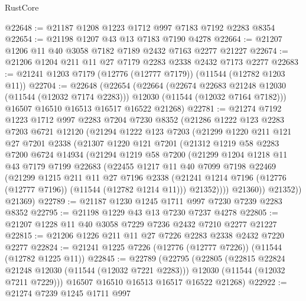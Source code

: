\begin{lexlean}{RustCore}
\begin{coremodule}
@22648 := @21187 @1208 @1223 @1712 @997 @7183 @7192 @2283 @8354
@22654 := @21198 @1207 @43 @13 @7183 @7190 @4278
@22664 := @21207 @1206 @11 @40 @3058 @7182 @7189 @2432 @7163 @2277 @21227
@22674 := @21206 @1204 @211 @11 @27 @7179 @2283 @2338 @2432 @7173 @2277
@22683 := @21241 @1203 @7179 (@12776 (@12777 @7179)) (@11544 (@12782 @1203 @11))
@22704 := @22648
    (@22654
      (@22664
        (@22674 @22683 @21248 @12030 (@11544 (@12032 @7174 @2283)))
        @12030
        (@11544 (@12032 @7164 @7182)))
      @16507
      @16510
      @16513
      @16517
      @16522
      @21268)
@22781 := @21274
    @7192
    @1223
    @1712
    @997
    @2283
    @7204
    @7230
    @8352
    (@21286
      @1222
      @123
      @2283
      @7203
      @6721
      @12120
      (@21294
        @1222
        @123
        @7203
        (@21299
          @1220
          @211
          @121
          @27
          @7201
          @2338
          (@21307
            @1220
            @121
            @7201
            (@21312
              @1219
              @58
              @2283
              @7200
              @6724
              @14934
              (@21294
                @1219
                @58
                @7200
                (@21299
                  @1204
                  @1218
                  @11
                  @43
                  @7179
                  @7199
                  @22683
                  (@22455
                    @1217
                    @11
                    @40
                    @7099
                    @7198
                    @22469
                    (@21299
                      @1215
                      @211
                      @11
                      @27
                      @7196
                      @2338
                      (@21241 @1214 @7196 (@12776 (@12777 @7196)) (@11544 (@12782 @1214 @11)))
                      @21352))))
              @21360))
          @21352))
      @21369)
@22789 := @21187 @1230 @1245 @1711 @997 @7230 @7239 @2283 @8352
@22795 := @21198 @1229 @43 @13 @7230 @7237 @4278
@22805 := @21207 @1228 @11 @40 @3058 @7229 @7236 @2432 @7210 @2277 @21227
@22815 := @21206 @1226 @211 @11 @27 @7226 @2283 @2338 @2432 @7220 @2277
@22824 := @21241 @1225 @7226 (@12776 (@12777 @7226)) (@11544 (@12782 @1225 @11))
@22845 := @22789
    (@22795
      (@22805
        (@22815 @22824 @21248 @12030 (@11544 (@12032 @7221 @2283)))
        @12030
        (@11544 (@12032 @7211 @7229)))
      @16507
      @16510
      @16513
      @16517
      @16522
      @21268)
@22922 := @21274
    @7239
    @1245
    @1711
    @997

\end{coremodule}
\end{lexlean}
